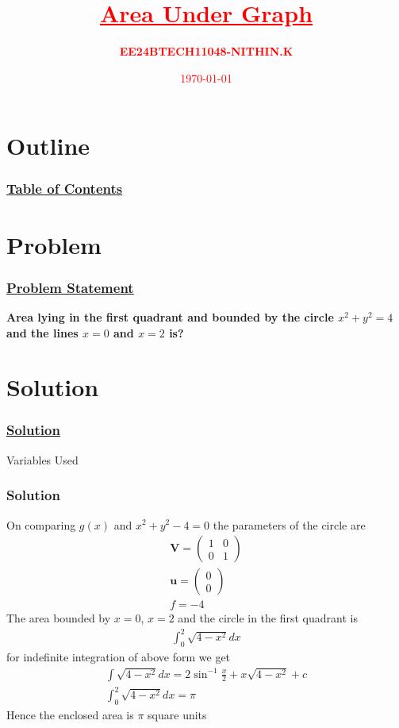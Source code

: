 \documentclass{beamer}
\title{\textcolor{red}{\underline{\textbf{Area Under Graph}}}}
\author{\textcolor{red}{\textbf{EE24BTECH11048-NITHIN.K}}}
\date{\textcolor{red}{\today}}
\providecommand{\brak}[1]{\ensuremath{\left(#1\right)}}
\theoremstyle{remark}
\newcommand{\myvec}[1]{\ensuremath{\begin{pmatrix}#1\end{pmatrix}}}
\let\vec\mathbf
\numberwithin{equation}{section}
\begin{document}
\begin{frame}
	\titlepage
\end{frame}

\section*{Outline}
\begin{frame}
	\frametitle{\underline{\textbf{Table of Contents}}}
	\tableofcontents
\end{frame}

\section{Problem}
\begin{frame}
	\frametitle{\underline{Problem Statement}}
	\textbf{Area lying in the first quadrant and bounded by the circle $x^2 + y^2 = 4$ and the lines $x = 0$ and $x = 2$ is?}
\end{frame}

\section{Solution}
\begin{frame}
	\frametitle{\underline{Solution}}
		\begin{table}[H]
			\centering
			\resizebox{\textwidth}{!}{
				
			}
			\caption{Variables Used}
		\end{table}
\end{frame}

\begin{frame}
	\frametitle{Solution}
	\small
	On comparing $g\brak{x}$ and $x^2 + y^2 - 4 = 0$ the parameters of the circle are
	\begin{align}
		\vec{V} = \myvec{ 1 & 0 \\
		0 & 1 } \\
		\vec{u} = \myvec{0 \\
		0 } \\
		f = -4
	\end{align}
	The area bounded by $x=0$, $x=2$ and the circle in the first quadrant is
	\begin{align}
		\int_{0}^{2}\sqrt{4 - x^2} dx
	\end{align}
	for indefinite integration of above form we get
	\begin{align}
		\int\sqrt{4 - x^2} dx = 2\sin^{-1}\frac{x}{2} + x\sqrt{4 - x^2} + c \\
		\int_{0}^{2}\sqrt{4 - x^2} dx = \pi
	\end{align}
	Hence the enclosed area is $\pi$ square units
\end{frame}
\end{document}
